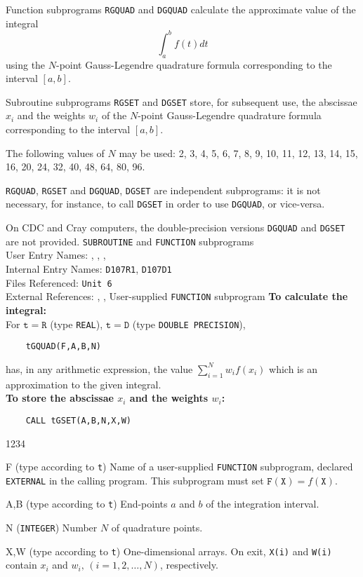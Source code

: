                              
                       
                   
                          \Revised{ }
Function subprograms {\tt RGQUAD} and {\tt DGQUAD} calculate the
approximate value of the integral
 $$ \int_a^b f(t)dt $$
using the $N$-point Gauss-Legendre quadrature formula corresponding to
the interval $[a,b]$.
\par
Subroutine subprograms {\tt RGSET} and {\tt DGSET} store, for
subsequent use, the abscissae $x_i$ and the weights $w_i$ of the
$N$-point Gauss-Legendre quadrature formula corresponding to the
interval $[a,b]$.
\par
The following values of $N$ may be used:
2, 3, 4, 5, 6, 7, 8, 9, 10, 11, 12, 13, 14, 15, 16,
20, 24, 32, 40, 48, 64, 80, 96.
\par
{\tt RGQUAD}, {\tt RGSET} and {\tt DGQUAD}, {\tt DGSET} are independent
subprograms: it is not necessary, for instance, to call {\tt DGSET} in
order to use {\tt DGQUAD}, or vice-versa.
\par
On CDC and Cray computers, the double-precision versions {\tt DGQUAD}
and {\tt DGSET} are not provided.
\Structure
{\tt SUBROUTINE} and {\tt FUNCTION} subprograms \\
User Entry Names: , , ,
 \\
Internal Entry Names: {\tt D107R1}, {\tt D107D1}  \\
Files Referenced: {\tt Unit 6} \\
External References: , ,
User-supplied {\tt FUNCTION} subprogram
\Usage
{\bf To calculate the integral:}  \\[2mm]
For $\mathtt{t=R}$ (type {\tt REAL}), $\mathtt{t=D}$ (type
{\tt DOUBLE PRECISION}),
\begin{verbatim}
    tGQUAD(F,A,B,N)
\end{verbatim}
has, in any arithmetic expression, the value
$\displaystyle \sum_{i=1}^N w_if(x_i)$
which is an approximation to the given integral. \\[3mm]
{\bf To store the abscissae $x_i$ and the weights $w_i$:}
\begin{verbatim}
    CALL tGSET(A,B,N,X,W)
\end{verbatim}
\begin{DLtt}{1234}
\item[F] (type according to {\tt t}) Name of a user-supplied
{\tt FUNCTION} subprogram, declared {\tt EXTERNAL} in the calling
program. This subprogram must set $\mathtt{F(X)} = f(\mathtt{X})$.
\item [A,B] (type according to {\tt t}) End-points $a$ and $b$ of
the integration interval.
\item [N] ({\tt INTEGER}) Number $N$ of quadrature points.
\item[X,W] (type according to {\tt t}) One-dimensional arrays. On exit,
{\tt X(i)} and {\tt W(i)} contain $x_i$ and $w_i,\,(i=1,2,\ldots,N)$,
respectively.
\end{DLtt}
